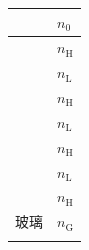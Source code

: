 \begin{center}
    \begin{tabular}{|>{\centering\arraybackslash}p{4cm}l|}
        \multicolumn{1}{>{\centering\arraybackslash}p{4cm}}{空气} & \multicolumn{1}{l}{$n_0$} \\
        \hline
          & $n_{\mathrm{H}}$ \\
        \hline
          & $n_{\mathrm{L}}$ \\
        \hline
          & $n_{\mathrm{H}}$ \\
        \hline
          & $n_{\mathrm{L}}$ \\
        \hline
          & $n_{\mathrm{H}}$ \\
        \hline
          & $n_{\mathrm{L}}$ \\
        \hline
          & $n_{\mathrm{H}}$ \\
        \hline
        玻璃 & $n_{\mathrm{G}}$ \\
         & 
    \end{tabular}
\end{center}
\vfill
